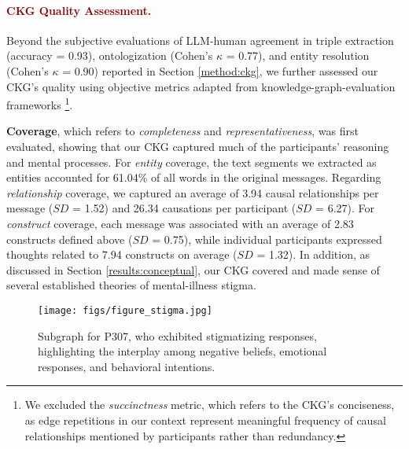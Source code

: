 \paragraph{\textcolor{darkred}{\textbf{CKG Quality Assessment.}}}



Beyond the subjective evaluations of LLM-human agreement in triple extraction (accuracy = 0.93), ontologization (Cohen's $\kappa$ = 0.77), and entity resolution (Cohen's $\kappa$ = 0.90) reported in Section \ref{method:ckg}, we further assessed our CKG's quality using objective metrics adapted from knowledge-graph-evaluation frameworks \cite{kg_evaluation_koutsiana_2024}\footnote{We excluded the \textit{succinctness} metric, which refers to the CKG's conciseness, as edge repetitions in our context represent meaningful frequency of causal relationships mentioned by participants rather than redundancy.}.

\textbf{Coverage}, which refers to \textit{completeness} and \textit{representativeness}, was first evaluated, showing that our CKG captured much of the participants' reasoning and mental processes.
For \textit{entity} coverage, the text segments we extracted as entities accounted for 61.04\% of all words in the original messages. 
Regarding \textit{relationship} coverage, we captured an average of 3.94 causal relationships per message ($SD$ = 1.52) and 26.34 causations per participant ($SD$ = 6.27). 
For \textit{construct} coverage, each message was associated with an average of 2.83 constructs defined above ($SD$ = 0.75), while individual participants expressed thoughts related to 7.94 constructs on average ($SD$ = 1.32). 
In addition, as discussed in Section \ref{results:conceptual}, our CKG covered and made sense of several established theories of mental-illness stigma.


\begin{figure*}
\centering
\texttt{[image: figs/figure\_stigma.jpg]}
\caption{Subgraph for P307, who exhibited stigmatizing responses, highlighting the interplay among negative beliefs, emotional responses, and behavioral intentions.}
\label{fig:stigmatizing_subgraph}
\end{figure*}


